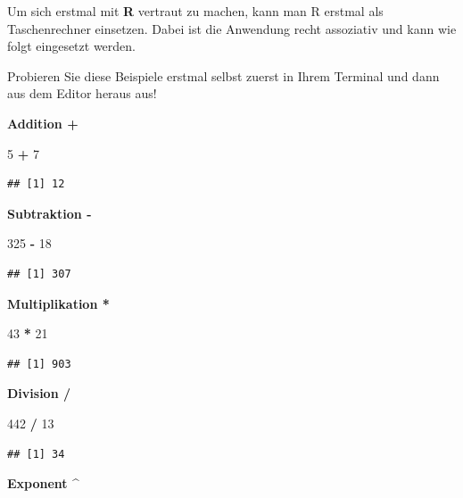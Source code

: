 \documentclass[]{book}
\newenvironment{Shaded}{\begin{snugshade}}{\end{snugshade}}
\newcommand{\DecValTok}[1]{\textcolor[rgb]{0.00,0.00,0.81}{#1}}
\newcommand{\StringTok}[1]{\textcolor[rgb]{0.31,0.60,0.02}{#1}}
\newcommand{\OperatorTok}[1]{\textcolor[rgb]{0.81,0.36,0.00}{\textbf{#1}}}
\begin{document}
Um sich erstmal mit \textbf{R} vertraut zu machen, kann man R erstmal
als Taschenrechner einsetzen. Dabei ist die Anwendung recht assoziativ
und kann wie folgt eingesetzt werden.

Probieren Sie diese Beispiele erstmal selbst zuerst in Ihrem Terminal
und dann aus dem Editor heraus aus!

\textbf{Addition + }

\begin{Shaded}
\begin{Highlighting}[]
\DecValTok{5} \OperatorTok{+}\StringTok{ }\DecValTok{7}
\end{Highlighting}
\end{Shaded}

\begin{verbatim}
## [1] 12
\end{verbatim}

\textbf{Subtraktion - }

\begin{Shaded}
\begin{Highlighting}[]
\DecValTok{325} \OperatorTok{-}\StringTok{ }\DecValTok{18}
\end{Highlighting}
\end{Shaded}

\begin{verbatim}
## [1] 307
\end{verbatim}

\textbf{Multiplikation * }

\begin{Shaded}
\begin{Highlighting}[]
\DecValTok{43} \OperatorTok{*}\StringTok{ }\DecValTok{21}
\end{Highlighting}
\end{Shaded}

\begin{verbatim}
## [1] 903
\end{verbatim}

\textbf{Division / }

\begin{Shaded}
\begin{Highlighting}[]
\DecValTok{442} \OperatorTok{/}\StringTok{ }\DecValTok{13}
\end{Highlighting}
\end{Shaded}

\begin{verbatim}
## [1] 34
\end{verbatim}

\textbf{Exponent \^{} }
\end{document}
